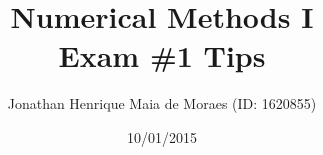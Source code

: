 \title{Numerical Methods I \\ Exam \#1 Tips}
\author{Jonathan Henrique Maia de Moraes (ID: 1620855)}
\date{10/01/2015}
\maketitle